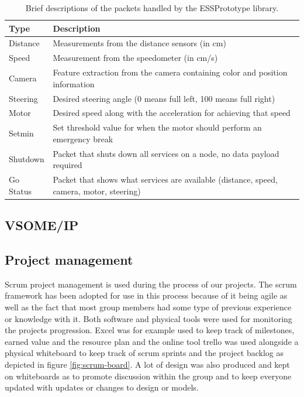 \documentclass[11pt, titlepage]{article} %
\begin{document}
\begin{table}
  \caption{Brief descriptions of the packets handled by the ESSPrototype library.}
  \label{tab:packets}
  \centering
  \begin{tabular}{|l|l|} \hline
    \textbf{Type} & \textbf{Description}  \\ \hline
    Distance & Measurements from the distance sensors (in cm) \\ \hline
    Speed & Measurement from the speedometer (in cm/s) \\ \hline
    Camera & Feature extraction from the camera containing color and position information  \\ \hline
    Steering & Desired steering angle (0 means full left, 100 means full right)  \\ \hline
    Motor & Desired speed along with the acceleration for achieving that speed \\ \hline
    Setmin & Set threshold value for when the motor should perform an emergency break  \\ \hline
    Shutdown & Packet that shuts down all services on a node, no data payload required  \\ \hline
    Go Status & Packet that shows what services are available (distance, speed, camera, motor, steering)  \\ \hline
     \end{tabular}
\end{table}

\subsection{VSOME/IP}


\subsection{Project management}
Scrum project management is used during the process of our projects.
The scrum framework has been adopted for use in this process because of it being agile as well as the fact that most group members had some type of previous experience or knowledge with it. Both software and physical tools were used for monitoring the projects progression. Excel was for example used to keep track of milestones, earned value and the resource plan and the online tool trello was used alongside a physical whiteboard to keep track of scrum sprints and the project backlog as depicted in figure \ref{fig:scrum-board}. A lot of design was also produced and kept on whiteboards as to promote discussion within the group and to keep everyone updated with updates or changes to design or models.
\end{document}

